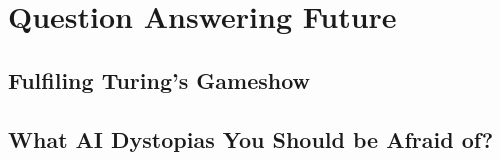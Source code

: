 \documentclass[bfivepaper,twosided,justified,nobib]{style/tufte-book}
\newif\ifproposal\proposalfalse
\newcommand{\proposalpart}[1]{
  \ifproposal
  \subsection{#1}
  \else
  \part{#1}
  \fi
}
\newcommand{\chapterfile}[3]{
  \ifproposal
     \invisiblechapter{#3}{ch:#2}
    \label{ch:#2}
  \paragraph{#3}
  
  \else
  \chapter{#3}
  \label{ch:#2}
  \begin{quote}
    
  \end{quote}
  
  \fi}
\begin{document}
\proposalpart{Question Answering Future}

\chapterfile{300}{gameshow}{Fulfiling Turing's Gameshow}

\chapterfile{310}{scifi}{What AI Dystopias You Should be Afraid of?}






\ifproposal

  
  \chapter*{Watson on Jeopardy!: \\ Unquestioned Answers from \abr{ibm}'s tour
    de force \\ (Sample Chapter)}
  
  \begin{quote}
    
  \end{quote}
  
  
\fi

\backmatter





\printindex
\end{document}
